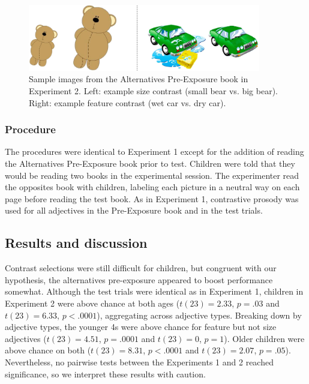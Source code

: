 \documentclass[man]{apa2}
\begin{document}
\begin{figure}[t] 
  \begin{center} 
    \includegraphics[width=4in]{figures/aliens_book_demo_mod.png} 
    \caption{\label{fig:book_demo} Sample images from the Alternatives Pre-Exposure book in Experiment 2. Left: example size contrast (small bear vs. big bear). Right: example feature contrast (wet car vs. dry car).}
  \end{center} 
\vspace{-10ex}
\end{figure}



\subsubsection{Procedure}

The procedures were identical to Experiment 1 except for the addition of reading the Alternatives Pre-Exposure book prior to test. Children were told that they would be
reading two books in the experimental session. The experimenter read the opposites book with children, labeling each picture in a neutral way on each page before reading the test book. As in Experiment 1, contrastive prosody was used for all adjectives in the Pre-Exposure book and in the test trials.


\subsection{Results and discussion}

Contrast selections were still difficult for children, but congruent with our hypothesis, the alternatives pre-exposure appeared to boost performance somewhat. Although the test trials were identical as in Experiment 1, children in Experiment 2 were above chance at both ages ($t(23) = 2.33$, $p = .03$ and $t(23) = 6.33$, $p < .0001$), aggregating across adjective types. Breaking down by adjective types, the younger 4s were above chance for feature but not size adjectives ($t(23) = 4.51$, $p = .0001$ and $t(23)=0$, $p = 1$). Older children were above chance on both ($t(23) = 8.31$, $p < .0001$ and $t(23)= 2.07$, $p = .05$). Nevertheless, no pairwise tests between the Experiments 1 and 2 reached significance, so we interpret these results with caution. 
\end{document}
